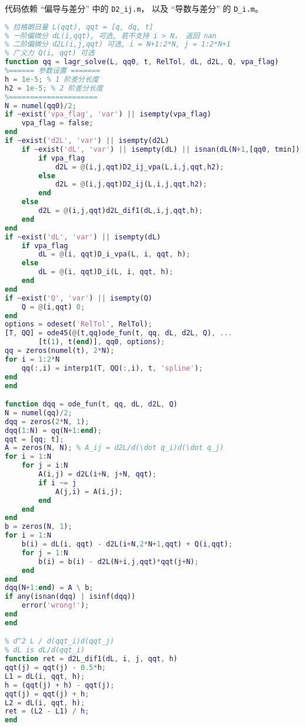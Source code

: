 代码依赖 “偏导与差分” 中的 \verb|D2_ij.m|， 以及 “导数与差分” 的 \verb|D_i.m|。
\begin{lstlisting}[language=matlab, caption=lagr\_solve.m]
% 数值解拉格朗日方程
% 拉格朗日量 L(qqt), qqt = [q, dq, t]
% 一阶偏微分 dL(i,qqt), 可选, 若不支持 i > N， 返回 nan
% 二阶偏微分 d2L(i,j,qqt) 可选, i = N+1:2*N, j = 1:2*N+1
% 广义力 Q(i, qqt) 可选
function qq = lagr_solve(L, qq0, t, RelTol, dL, d2L, Q, vpa_flag)
%====== 参数设置 =======
h = 1e-5; % 1 阶差分长度
h2 = 1e-5; % 2 阶差分长度
%=====================
N = numel(qq0)/2;
if ~exist('vpa_flag', 'var') || isempty(vpa_flag)
    vpa_flag = false;
end
if ~exist('d2L', 'var') || isempty(d2L)
    if ~exist('dL', 'var') || isempty(dL) || isnan(dL(N+1,[qq0, tmin]))
        if vpa_flag
            d2L = @(i,j,qqt)D2_ij_vpa(L,i,j,qqt,h2);
        else
            d2L = @(i,j,qqt)D2_ij(L,i,j,qqt,h2);
        end
    else
        d2L = @(i,j,qqt)d2L_dif1(dL,i,j,qqt,h);
    end
end
if ~exist('dL', 'var') || isempty(dL)
    if vpa_flag
        dL = @(i, qqt)D_i_vpa(L, i, qqt, h);
    else
        dL = @(i, qqt)D_i(L, i, qqt, h);
    end
end
if ~exist('Q', 'var') || isempty(Q)
    Q = @(i,qqt) 0;
end
options = odeset('RelTol', RelTol);
[T, QQ] = ode45(@(t,qq)ode_fun(t, qq, dL, d2L, Q), ...
        [t(1), t(end)], qq0, options);
qq = zeros(numel(t), 2*N);
for i = 1:2*N
    qq(:,i) = interp1(T, QQ(:,i), t, 'spline');
end
end

function dqq = ode_fun(t, qq, dL, d2L, Q)
N = numel(qq)/2;
dqq = zeros(2*N, 1);
dqq(1:N) = qq(N+1:end);
qqt = [qq; t];
A = zeros(N, N); % A_ij = d2L/d(\dot q_i)d(\dot q_j)
for i = 1:N
    for j = i:N
        A(i,j) = d2L(i+N, j+N, qqt);
        if i ~= j
            A(j,i) = A(i,j);
        end
    end
end
b = zeros(N, 1);
for i = 1:N
    b(i) = dL(i, qqt) - d2L(i+N,2*N+1,qqt) + Q(i,qqt);
    for j = 1:N
        b(i) = b(i) - d2L(N+i,j,qqt)*qqt(j+N);
    end
end
dqq(N+1:end) = A \ b;
if any(isnan(dqq) | isinf(dqq))
    error('wrong!');
end
end

% d^2 L / d(qqt_i)d(qqt_j)
% dL is dL/d(qqt_i)
function ret = d2L_dif1(dL, i, j, qqt, h)
qqt(j) = qqt(j) - 0.5*h;
L1 = dL(i, qqt, h);
h = (qqt(j) + h) - qqt(j);
qqt(j) = qqt(j) + h;
L2 = dL(i, qqt, h);
ret = (L2 - L1) / h;
end
\end{lstlisting}

